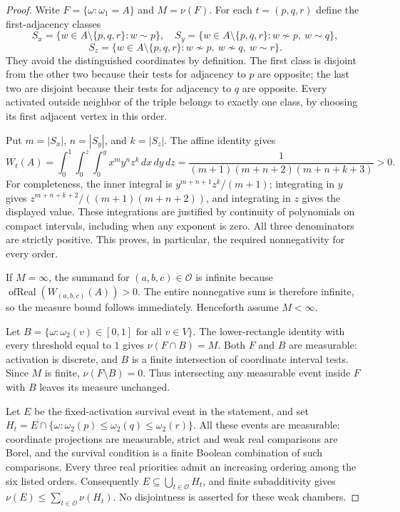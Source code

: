 \begin{proof}
Write $F=\{\omega:\omega_1=A\}$ and $M=\nu(F)$.  For each
$t=(p,q,r)$ define the first-adjacency classes
\[
S_x=\{w\in A\setminus\{p,q,r\}:w\sim p\},\quad
S_y=\{w\in A\setminus\{p,q,r\}:w\not\sim p,\ w\sim q\},
\]
\[
S_z=\{w\in A\setminus\{p,q,r\}:w\not\sim p,\ w\not\sim q,\ w\sim r\}.
\]
They avoid the distinguished coordinates by definition.  The first class
is disjoint from the other two because their tests for adjacency to $p$
are opposite; the last two are disjoint because their tests for adjacency
to $q$ are opposite.  Every activated outside neighbor of the triple belongs
to exactly one class, by choosing its first adjacent vertex in this order.

Put $m=|S_x|$, $n=|S_y|$, and $k=|S_z|$.  The affine identity
 gives
\[
W_t(A)=\int_0^1\int_0^z\int_0^y x^m y^n z^k\,dx\,dy\,dz
=\frac{1}{(m+1)(m+n+2)(m+n+k+3)}>0.
\]
For completeness, the inner integral is
$y^{m+n+1}z^k/(m+1)$; integrating in $y$ gives
$z^{m+n+k+2}/((m+1)(m+n+2))$, and integrating in $z$ gives
the displayed value.  These integrations are justified by continuity of
polynomials on compact intervals, including when any exponent is zero.
All three denominators are strictly positive.  This proves, in particular,
the required nonnegativity for every order.

If $M=\infty$, the summand for $(a,b,c)\in\mathcal O$ is infinite because
$\operatorname{ofReal}(W_{(a,b,c)}(A))>0$.  The entire nonnegative sum is
therefore infinite, so the measure bound follows immediately.  Henceforth
assume $M<\infty$.

Let $B=\{\omega:\omega_2(v)\in[0,1]\text{ for all }v\in V\}$.
The lower-rectangle identity with every threshold equal to $1$ gives
$\nu(F\cap B)=M$.  Both $F$ and $B$ are measurable: activation is discrete,
and $B$ is a finite intersection of coordinate interval tests.  Since $M$
is finite, $\nu(F\setminus B)=0$.  Thus intersecting any measurable event
inside $F$ with $B$ leaves its measure unchanged.

Let $E$ be the fixed-activation survival event in the statement, and set
$H_t=E\cap\{\omega:\omega_2(p)\le\omega_2(q)\le\omega_2(r)\}$.
All these events are measurable: coordinate projections are measurable,
strict and weak real comparisons are Borel, and the survival condition
is a finite Boolean combination of such comparisons.  Every three real
priorities admit an increasing ordering among the six listed orders.
Consequently $E\subseteq\bigcup_{t\in\mathcal O}H_t$, and finite
subadditivity gives $\nu(E)\le\sum_{t\in\mathcal O}\nu(H_t)$.
No disjointness is asserted for these weak chambers.


\end{proof}
